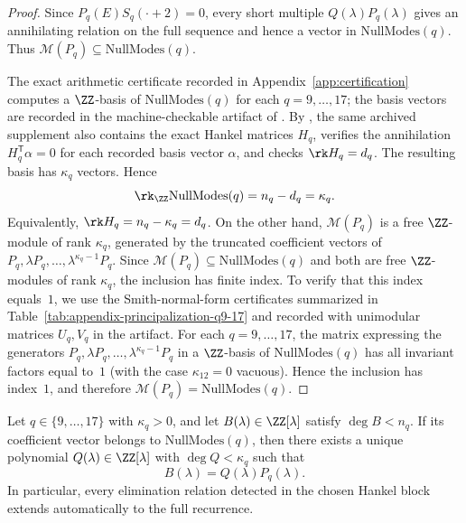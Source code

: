 \begin{proof}
Since \(P_q(E)S_q(\cdot+2)=0\), every short multiple \(Q(\lambda)P_q(\lambda)\)
gives an annihilating relation on the full sequence and hence a vector in
\(\mathrm{NullModes}(q)\).  Thus \(\mathcal M(P_q)\subseteq \mathrm{NullModes}(q)\).

The exact arithmetic certificate recorded in Appendix~\ref{app:certification}
computes a \(\ZZ\)-basis of \(\mathrm{NullModes}(q)\) for each
\(q=9,\dots,17\); the basis vectors are recorded in the machine-checkable
artifact of .  By
, the same archived supplement also
contains the exact Hankel matrices \(H_q\), verifies the annihilation
\(H_q^{\mathsf T}\alpha=0\) for each recorded basis vector \(\alpha\), and
checks \(\rk H_q=d_q\).  The resulting basis has \(\kappa_q\) vectors.  Hence
\[
  \rk_{\ZZ}\mathrm{NullModes}(q)=n_q-d_q=\kappa_q.
\]
Equivalently, \(\rk H_q=n_q-\kappa_q=d_q\).
On the other hand, \(\mathcal M(P_q)\) is a free \(\ZZ\)-module of rank
\(\kappa_q\), generated by the truncated coefficient vectors of
\(P_q,\lambda P_q,\dots,\lambda^{\kappa_q-1}P_q\).  Since
\(\mathcal M(P_q)\subseteq \mathrm{NullModes}(q)\) and both are free
\(\ZZ\)-modules of rank \(\kappa_q\), the inclusion has finite index.  To
verify that this index equals~\(1\), we use the Smith-normal-form certificates
summarized in Table~\ref{tab:appendix-principalization-q9-17} and recorded with
unimodular matrices \(U_q,V_q\) in the artifact.  For each
\(q=9,\dots,17\), the matrix expressing the generators
\(P_q,\lambda P_q,\dots,\lambda^{\kappa_q-1}P_q\) in a \(\ZZ\)-basis of
\(\mathrm{NullModes}(q)\) has all invariant factors equal to~\(1\)
(with the case \(\kappa_{12}=0\) vacuous).  Hence the inclusion has index~\(1\),
and therefore
\(\mathcal M(P_q)=\mathrm{NullModes}(q)\).
\end{proof}

\begin{corollary}
\label{cor:no-spurious-elimination}
Let \(q\in\{9,\dots,17\}\) with \(\kappa_q>0\), and let
\(B(\lambda)\in\ZZ[\lambda]\) satisfy \(\deg B<n_q\).  If its coefficient vector
belongs to \(\mathrm{NullModes}(q)\), then there exists a unique polynomial
\(Q(\lambda)\in\ZZ[\lambda]\) with \(\deg Q<\kappa_q\) such that
\[
  B(\lambda)=Q(\lambda)P_q(\lambda).
\]
In particular, every elimination relation detected in the chosen Hankel block
extends automatically to the full recurrence.
\end{corollary}

